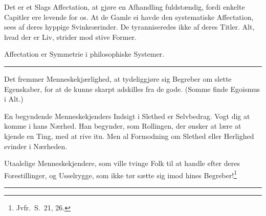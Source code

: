 \documentclass[12pt]{article}
\newcommand{\opage}[1]{\marginnote{\footnotesize\textit{[#1]}}}
\newcommand{\ombreak}{\par\medskip\begin{center}\rule{0.32\textwidth}{0.4pt}\end{center}\medskip}
\begin{document}
Det er et Slags Affectation, at gjøre en Afhandling fuldstændig, fordi enkelte Capitler ere levende for os. \opage{188}At de Gamle ei havde den systematiske Affectation, sees af deres hyppige Svinkeærinder. De tyranniseredes ikke af deres Titler. Alt, hvad der er Liv, strider mod stive Former.

Affectation er Symmetrie i philosophiske Systemer.

\ombreak

Det fremmer Menneskekjærlighed, at tydeliggjøre sig Begreber om slette Egenskaber, for at de kunne skarpt adskilles fra de gode. (Somme finde Egoismus i Alt.)

En begyndende Menneskekjenders Indsigt i Slethed er Selvbedrag. Vogt dig at komme i hans Nærhed. Han begynder, som Rollingen, der ønsker at lære at kjende en Ting, med at rive itu. Men al Formodning om Slethed eller Herlighed svinder i Nærheden.

Utaalelige Menneskekjendere, som ville tvinge Folk til at handle efter deres Forestillinger, og Usselrygge, som ikke tør sætte sig imod hines Begreber!\footnote{Jvfr.\ S.\ 21, 26.}

\ombreak
\end{document}
